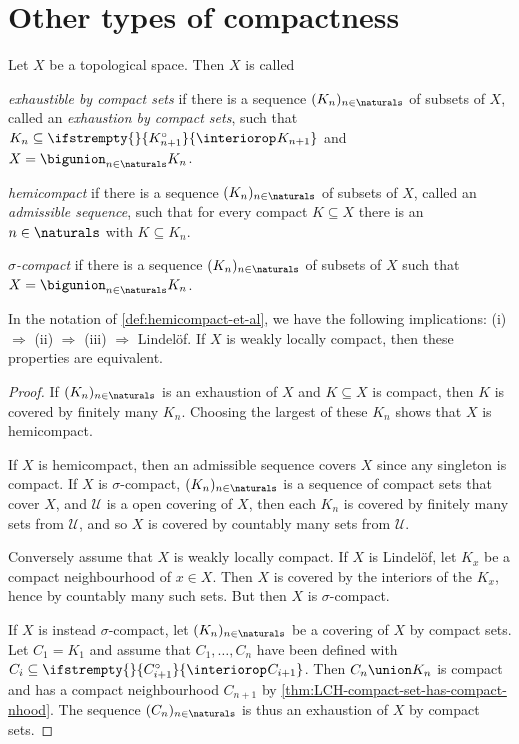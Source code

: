 \documentclass[article, a4paper, 11pt, oneside]{memoir}
\numberwithin{equation}{chapter}
\newcommand{\calU}{\mathcal{U}}
\renewcommand\interior[2][]{%
    \ifstrempty{#1}{%
        #2^{\circ}
    }{%
        \interiorop_{#1}#2
    }%
}
\begin{document}
\section{Other types of compactness}

\begin{definition}
    \label{def:hemicompact-et-al}
    Let $X$ be a topological space. Then $X$ is called
    \begin{enumdef}
        \item \emph{exhaustible by compact sets} if there is a sequence $(K_n)_{n \in \naturals}$ of subsets of $X$, called an \emph{exhaustion by compact sets}, such that $K_n \subseteq \interior{K_{n+1}}$ and $X = \bigunion_{n \in \naturals} K_n$.
        
        \item \emph{hemicompact} if there is a sequence $(K_n)_{n \in \naturals}$ of subsets of $X$, called an \emph{admissible sequence}, such that for every compact $K \subseteq X$ there is an $n \in \naturals$ with $K \subseteq K_n$.

        \item \emph{$\sigma$-compact} if there is a sequence $(K_n)_{n \in \naturals}$ of subsets of $X$ such that $X = \bigunion_{n \in \naturals} K_n$.
    \end{enumdef}
\end{definition}


\begin{proposition}
    In the notation of \cref{def:hemicompact-et-al}, we have the following implications: (i) $\Rightarrow$ (ii) $\Rightarrow$ (iii) $\Rightarrow$ Lindelöf. If $X$ is weakly locally compact, then these properties are equivalent.
\end{proposition}

\begin{proof}
    If $(K_n)_{n \in \naturals}$ is an exhaustion of $X$ and $K \subseteq X$ is compact, then $K$ is covered by finitely many $K_n$. Choosing the largest of these $K_n$ shows that $X$ is hemicompact.

    If $X$ is hemicompact, then an admissible sequence covers $X$ since any singleton is compact. If $X$ is $\sigma$-compact, $(K_n)_{n \in \naturals}$ is a sequence of compact sets that cover $X$, and $\calU$ is a open covering of $X$, then each $K_n$ is covered by finitely many sets from $\calU$, and so $X$ is covered by countably many sets from $\calU$.

    Conversely assume that $X$ is weakly locally compact. If $X$ is Lindelöf, let $K_x$ be a compact neighbourhood of $x \in X$. Then $X$ is covered by the interiors of the $K_x$, hence by countably many such sets. But then $X$ is $\sigma$-compact.

    If $X$ is instead $\sigma$-compact, let $(K_n)_{n \in \naturals}$ be a covering of $X$ by compact sets. Let $C_1 = K_1$ and assume that $C_1, \ldots, C_n$ have been defined with $C_i \subseteq \interior{C_{i+1}}$. Then $C_n \union K_n$ is compact and has a compact neighbourhood $C_{n+1}$ by \cref{thm:LCH-compact-set-has-compact-nhood}. The sequence $(C_n)_{n \in \naturals}$ is thus an exhaustion of $X$ by compact sets.
\end{proof}
\end{document}
